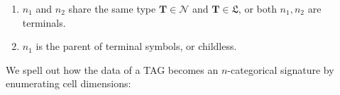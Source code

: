 \begin{myboxB}
\begin{multicols}{2}
\begin{defn}
\begin{itemize}
{\begin{enumerate}
\item{$n_1$ and $n_2$ share the same type $\mathbf{T} \in \mathcal{N}$ and $\mathbf{T} \in \mathfrak{L}$, or both $n_1,n_2$ are terminals.}
\item{$n_1$ is the parent of terminal symbols, or childless.}
\end{enumerate}
}
\end{itemize}
\end{defn}
\end{multicols}
\end{myboxB}

\begin{myboxB}
\begin{multicols}{2}
\begin{construction}
We spell out how the data of a TAG becomes an $n$-categorical signature by enumerating cell dimensions:


\end{construction}
\end{multicols}
\end{myboxB}
